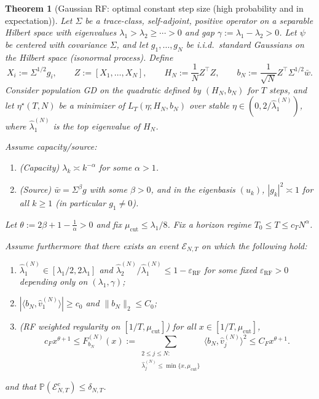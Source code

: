 \documentclass[11pt]{article}
\newtheorem{theorem}{Theorem}
\begin{document}
\begin{theorem}[Gaussian RF: optimal constant step size (high probability and in expectation)]
\label{thm:RF-clean}
Let $\Sigma$ be a trace-class, self-adjoint, positive operator on a separable Hilbert space
with eigenvalues $\lambda_1>\lambda_2\ge\cdots>0$ and gap $\gamma:=\lambda_1-\lambda_2>0$.
Let $\psi$ be centered with covariance $\Sigma$, and let $g_1,\dots,g_N$ be i.i.d.\ standard
Gaussians on the Hilbert space (isonormal process). Define
\[
X_i:=\Sigma^{1/2}g_i,\qquad Z:=[X_1,\dots,X_N],\qquad
H_N:=\frac1N Z^\top Z,\qquad b_N:=\frac{1}{\sqrt N}Z^\top\Sigma^{1/2}\bar w.
\]
Consider population GD on the quadratic defined by $(H_N,b_N)$ for $T$ steps, and let
$\eta^\star(T,N)$ be a minimizer of $L_T(\eta;H_N,b_N)$ over stable $\eta\in(0,2/\widehat\lambda_1^{(N)})$,
where $\widehat\lambda_1^{(N)}$ is the top eigenvalue of $H_N$.

Assume capacity/source:
\begin{enumerate}[label=(\roman*),leftmargin=*]
\item (Capacity) $\lambda_k\asymp k^{-\alpha}$ for some $\alpha>1$.
\item (Source) $\bar w=\Sigma^\beta g$ with some $\beta>0$, and in the eigenbasis $(u_k)$,
      $|g_k|^2\asymp 1$ for all $k\ge 1$ (in particular $g_1\neq 0$).
\end{enumerate}
Let $\theta:=2\beta+1-\frac{1}{\alpha}>0$ and fix $\mu_{\mathrm{cut}}\le \lambda_1/8$.
Fix a horizon regime $T_0\le T\le c_T N^\alpha$.

Assume furthermore that there exists an event $\mathcal E_{N,T}$ on which the following hold:
\begin{enumerate}[label=(\alph*),leftmargin=*]
\item $\widehat\lambda_1^{(N)}\in[\lambda_1/2,2\lambda_1]$ and
      $\widehat\lambda_2^{(N)}/\widehat\lambda_1^{(N)}\le 1-\varepsilon_{\mathrm{RF}}$
      for some fixed $\varepsilon_{\mathrm{RF}}>0$ depending only on $(\lambda_1,\gamma)$;
\item $|\langle b_N,\widehat v_1^{(N)}\rangle|\ge c_0$ and $\|b_N\|_2\le C_0$;
\item (RF weighted regularity on $[1/T,\mu_{\mathrm{cut}}]$) for all $x\in[1/T,\mu_{\mathrm{cut}}]$,
\[
c_F x^{\theta+1}\le
F^{(N)}_{b_N}(x)
:=
\sum_{\substack{2\le j\le N:\\ \widehat\lambda_j^{(N)}\le \min\{x,\mu_{\mathrm{cut}}\}}}
\langle b_N,\widehat v_j^{(N)}\rangle^2
\le C_F x^{\theta+1}.
\]
\end{enumerate}
and that $\mathbb P(\mathcal E_{N,T}^c)\le \delta_{N,T}$.


\end{theorem}
\end{document}
